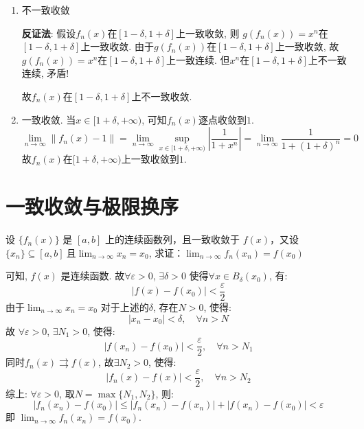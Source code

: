 \begin{solution}
\begin{enumerate}
        \item 不一致收敛

            \textbf{反证法}:
            假设\(f_{n}(x)\)在\([1-\delta,1+\delta]\)上一致收敛, 则 \(g(f_n(x))=x^{n}\)在\([1-\delta,1+\delta]\)上一致收敛.
            由于\(g(f_n(x))\)在\([1-\delta,1+\delta]\)上一致收敛,
            故\(g(f_n(x)) = x^{n}\)在\([1-\delta,1+\delta]\)上一致连续.
            但\(x^{n}\)在\([1-\delta,1+\delta]\)上不一致连续, 矛盾!

            故\(f_{n}(x)\)在\([1-\delta,1+\delta]\)上不一致收敛.

        \item 一致收敛.
            当\(x \in [1+\delta,+\infty)\), 可知\(f_n(x)\)逐点收敛到\(1\). %
            \[
                \lim_{n \to \infty} \left\lVert f_{n}(x) - 1 \right\rVert
                = \lim_{n \to \infty} \sup_{x \in [1+\delta,+\infty)} \left\vert %
                \frac{1}{1 + x^{n}} \right\vert
                = \lim_{n \to \infty} \frac{1}{1+(1+\delta)^{n}} = 0
            \]
            故\(f_{n}(x)\)在\([1+\delta,+\infty)\)上一致收敛到\(1\). %
    \end{enumerate}
\end{solution}

\section{一致收敛与极限换序}
\begin{problem}
    设 \(\{f_n(x)\}\) 是 \([a, b]\) 上的连续函数列，且一致收敛于 \(f(x)\)，又设\(\{x_n\}
    \subseteq [a, b] \ \)且\( \lim_{n \to \infty} x_n = x_0\),
    求证：\(\lim_{n \to \infty} f_n(x_n) = f(x_0)\)
\end{problem}

\begin{solution}
    可知, \(f(x)\) 是连续函数. 故\(\forall \varepsilon > 0\), \(\exists \delta > 0\)
    使得\(\forall x \in B_{\delta}(x_{0})\), 有:
    \[
        \left| f(x)- f(x_{0}) \right| < \frac{\varepsilon}{2}
    \]
    由于\(\lim_{n \to \infty} x_{n}=x_{0}\) 对于上述的\(\delta\), 存在\(N>0\), 使得:
    \[
        \left| x_{n} - x_{0} \right| < \delta, \quad \forall n > N
    \]
    故 \(\forall \varepsilon > 0\), \(\exists N_1 > 0\), 使得:
    \[
        \left| f(x_{n})- f(x_{0}) \right| < \frac{\varepsilon}{2}, \quad
        \forall n > N_1
    \]
    同时\(f_{n}(x) \rightrightarrows f(x)\), 故\(\exists N_2 > 0\), 使得:
    \[
        \left| f_{n}(x) - f(x) \right| < \frac{\varepsilon}{2}, \quad
        \forall n > N_2
    \]
    综上: \(\forall \varepsilon > 0\), 取\(N = \max\{N_1, N_2\}\), 则:
    \[
        \left| f_{n}(x_{n}) - f(x_{0}) \right| \le \left| f_{n}(x_{n}) -
        f(x_{n}) \right| + \left| f(x_{n}) - f(x_{0}) \right| < \varepsilon
    \]
    即 \(\lim_{n \to \infty} f_{n}(x_{n}) = f(x_{0})\).
\end{solution}

